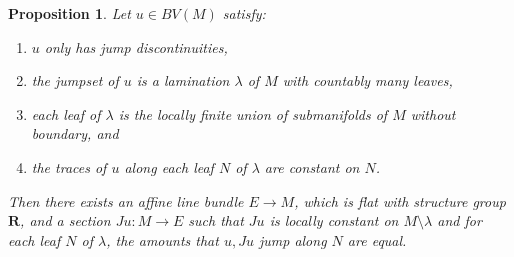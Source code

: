 \documentclass[reqno,10pt]{amsart}
\newcommand{\RR}{\mathbf{R}}
\newtheorem{proposition}[theorem]{Proposition}
\theoremstyle{definition}
\numberwithin{equation}{section}
\begin{document}
\begin{proposition}\label{existence of jump graphs}
Let $u \in BV(M)$ satisfy:
\begin{enumerate}
\item $u$ only has jump discontinuities,
\item the jumpset of $u$ is a lamination $\lambda$ of $M$ with countably many leaves,
\item each leaf of $\lambda$ is the locally finite union of submanifolds of $M$ without boundary, and
\item the traces of $u$ along each leaf $N$ of $\lambda$ are constant on $N$.
\end{enumerate}
Then there exists an affine line bundle $E \to M$, which is flat with structure group $\RR$, and a section $Ju: M \to E$ such that $Ju$ is locally constant on $M \setminus \lambda$ and for each leaf $N$ of $\lambda$, the amounts that $u, Ju$ jump along $N$ are equal.
\end{proposition}
\end{document}
